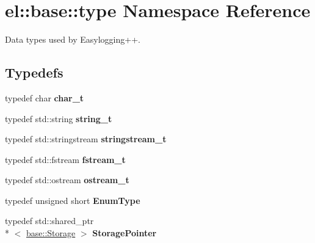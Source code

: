 \hypertarget{namespaceel_1_1base_1_1type}{\section{el\-:\-:base\-:\-:type Namespace Reference}
\label{namespaceel_1_1base_1_1type}
}


Data types used by Easylogging++.  


\subsection*{Typedefs}
\begin{DoxyCompactItemize}
\item 
\hypertarget{namespaceel_1_1base_1_1type_ae9fe1ba101c2444b8cad9a2484b54907}{typedef char {\bfseries char\-\_\-t}}\label{namespaceel_1_1base_1_1type_ae9fe1ba101c2444b8cad9a2484b54907}

\item 
\hypertarget{namespaceel_1_1base_1_1type_a67e406cd213c231f1d135b5a4eda64b5}{typedef std\-::string {\bfseries string\-\_\-t}}\label{namespaceel_1_1base_1_1type_a67e406cd213c231f1d135b5a4eda64b5}

\item 
\hypertarget{namespaceel_1_1base_1_1type_a3492908c4b80f97b6c4b346d394f1302}{typedef std\-::stringstream {\bfseries stringstream\-\_\-t}}\label{namespaceel_1_1base_1_1type_a3492908c4b80f97b6c4b346d394f1302}

\item 
\hypertarget{namespaceel_1_1base_1_1type_a620c830ead75d26b45c060c211ee2685}{typedef std\-::fstream {\bfseries fstream\-\_\-t}}\label{namespaceel_1_1base_1_1type_a620c830ead75d26b45c060c211ee2685}

\item 
\hypertarget{namespaceel_1_1base_1_1type_a74ea109bf34d1c44926837fb0830f445}{typedef std\-::ostream {\bfseries ostream\-\_\-t}}\label{namespaceel_1_1base_1_1type_a74ea109bf34d1c44926837fb0830f445}

\item 
\hypertarget{namespaceel_1_1base_1_1type_afb892a99b7545bf6e45c1e1d84af2ec9}{typedef unsigned short {\bfseries Enum\-Type}}\label{namespaceel_1_1base_1_1type_afb892a99b7545bf6e45c1e1d84af2ec9}

\item 
\hypertarget{namespaceel_1_1base_1_1type_a3c34822c3825018aca1526f2289b7976}{typedef std\-::shared\-\_\-ptr\\*
$<$ \hyperlink{classel_1_1base_1_1Storage}{base\-::\-Storage} $>$ {\bfseries Storage\-Pointer}}\label{namespaceel_1_1base_1_1type_a3c34822c3825018aca1526f2289b7976}


\end{DoxyCompactItemize}
